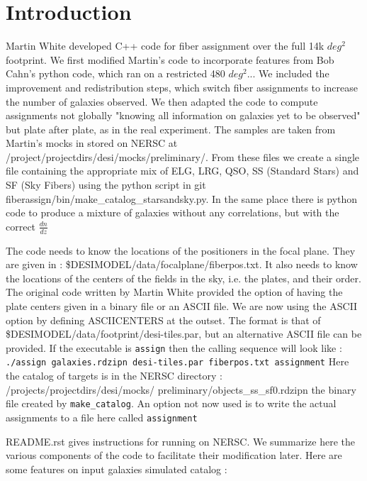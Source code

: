 \documentclass{extarticle}
\def\sqd{$deg^{2}$}
\begin{document}
\section{Introduction}
Martin White developed C++ code for fiber assignment over the full 14k \sqd footprint.  We first modified Martin's code to incorporate features from Bob Cahn's python code, which ran on a restricted 480 \sqd... We included the improvement and redistribution steps, which switch fiber assignments to increase the number of galaxies observed. We then adapted the code to compute assignments not globally "knowing all information on galaxies yet to be observed" but plate after plate, as in the real experiment.
The samples are taken from Martin's mocks in stored on NERSC at /project/projectdirs/desi/mocks/preliminary/.  From these files we create a single file containing the appropriate mix of ELG, LRG, QSO, SS (Standard Stars) and SF (Sky Fibers) using the python script in git fiberassign/bin/make\_catalog\_starsandsky.py.  In the same place there is python code to produce a mixture of galaxies without any correlations, but with the correct $\frac{dn}{dz}$  
  
The code needs to know the locations of the positioners in the focal plane. They are given in : \$DESIMODEL/data/focalplane/fiberpos.txt.
It also needs to know the locations of the centers of the fields in the sky, i.e. the plates, and their order.  The original code written by Martin White provided the option of having the plate centers given in a binary file or an ASCII file.  We are now using the ASCII option by defining ASCIICENTERS at the outset. The format is that of \$DESIMODEL/data/footprint/desi-tiles.par, but an alternative ASCII file can be provided. If the executable is {\tt assign} then the calling sequence will look like :
{\tt./assign galaxies.rdzipn desi-tiles.par fiberpos.txt assignment}
 Here the catalog of targets is in the NERSC directory : /projects/projectdirs/desi/mocks/ preliminary/objects\_ss\_sf0.rdzipn the binary file created by {\tt make\_catalog}. An option not now used is to write the actual assignments to a file here called {\tt assignment}
  
README.rst gives instructions for running on NERSC.
We summarize here the various components of the code to facilitate their modification later.
Here are some features on input galaxies simulated catalog :
\end{document}
